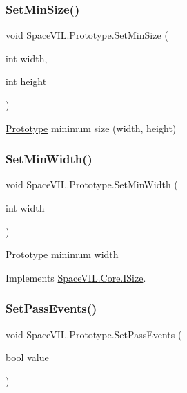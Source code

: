 \subsubsection{\texorpdfstring{Set\+Min\+Size()}{SetMinSize()}}
{\footnotesize\ttfamily void Space\+V\+I\+L.\+Prototype.\+Set\+Min\+Size (\begin{DoxyParamCaption}\item[{int}]{width,  }\item[{int}]{height }\end{DoxyParamCaption})}



\mbox{\hyperlink{class_space_v_i_l_1_1_prototype}{Prototype}} minimum size (width, height) 

\mbox{\label{class_space_v_i_l_1_1_prototype_a9594f8484683ec450e8ce20b0c5fad1c}} 
\subsubsection{\texorpdfstring{Set\+Min\+Width()}{SetMinWidth()}}
{\footnotesize\ttfamily void Space\+V\+I\+L.\+Prototype.\+Set\+Min\+Width (\begin{DoxyParamCaption}\item[{int}]{width }\end{DoxyParamCaption})}



\mbox{\hyperlink{class_space_v_i_l_1_1_prototype}{Prototype}} minimum width 



Implements \mbox{\hyperlink{interface_space_v_i_l_1_1_core_1_1_i_size}{Space\+V\+I\+L.\+Core.\+I\+Size}}.

\mbox{\label{class_space_v_i_l_1_1_prototype_ac2a3bb6f4b5c26dba5375eabf774de74}} 
\subsubsection{\texorpdfstring{Set\+Pass\+Events()}{SetPassEvents()}\hspace{0.1cm}{\footnotesize\ttfamily [1/2]}}
{\footnotesize\ttfamily void Space\+V\+I\+L.\+Prototype.\+Set\+Pass\+Events (\begin{DoxyParamCaption}\item[{bool}]{value }\end{DoxyParamCaption})}



